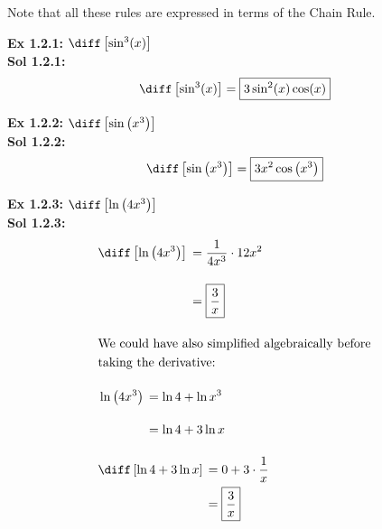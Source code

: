 Note that all these rules are expressed in terms of the Chain Rule.

\begin{center}  
\end{center}

\textbf{Ex 1.2.1: } $\diff \left[\sin^3 (x)\right]$ \\[11pt]
\textbf{Sol 1.2.1: } \begin{align*}
    \diff \left[\sin^3 (x)\right] = \boxed{3\sin^2 (x)\cos (x)}
\end{align*} 

\textbf{Ex 1.2.2: } $\diff \left[\sin \left(x^3\right)\right]$ \\[11pt]
\textbf{Sol 1.2.2: } \begin{align*}
    \diff\left[\sin \left(x^3\right)\right] = \boxed{3x^2\cos  \left(x^3\right)}
\end{align*}

\textbf{Ex 1.2.3: } $\diff \left[\ln \left(4x^3\right)\right]$ \\[11pt]
\textbf{Sol 1.2.3: } \begin{align*}
    & \diff \left[\ln \left(4x^3\right)\right] \begin{aligned}[t]
        & = \dfrac{1}{4x^3} \cdot 12x^2 \\[11pt]
        & = \boxed{\dfrac{3}{x}} 
    \end{aligned} \\[11pt]
    & \text{We could have also simplified algebraically before} \\
    & \text{taking the derivative: } \\[11pt]
    & \ln \left(4x^3\right) \begin{aligned}[t]
        & = \ln 4 + \ln x^3 \\[11pt]
        & = \ln 4 + 3\ln x 
    \end{aligned} \\[11pt]
    & \diff \left[\ln 4 + 3\ln x\right] \begin{aligned}[t]
        & = 0 + 3 \cdot \dfrac{1}{x} \\
        & = \boxed{\dfrac{3}{x}}
    \end{aligned}
\end{align*}

